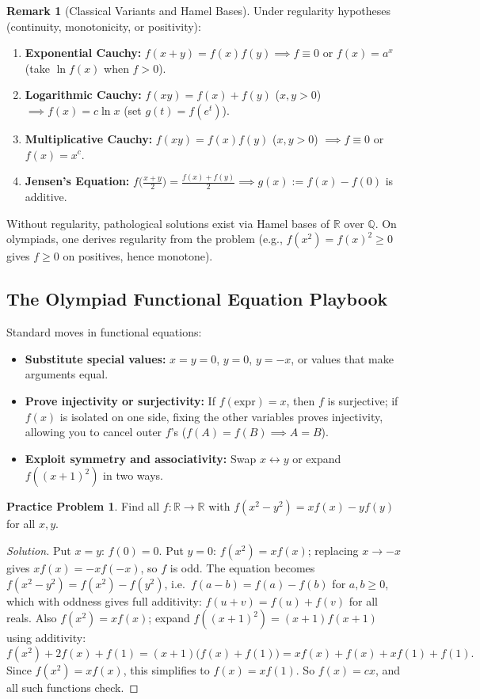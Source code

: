 \documentclass[11pt]{article}
\theoremstyle{plain}
\theoremstyle{definition}
\newtheorem{problem}[theorem]{Practice Problem}
\newtheorem{remark}[theorem]{Remark}
\newenvironment{solution}{\begin{proof}[Solution]}{\end{proof}}
\newcommand{\QQ}{\mathbb{Q}}
\newcommand{\RR}{\mathbb{R}}
\begin{document}
\begin{remark}[Classical Variants and Hamel Bases]
Under regularity hypotheses (continuity, monotonicity, or positivity):
\begin{enumerate}[label=(\arabic*)]
\item \textbf{Exponential Cauchy:} $f(x+y)=f(x)f(y) \implies f\equiv 0$ or $f(x)=a^x$ (take $\ln f(x)$ when $f>0$).
\item \textbf{Logarithmic Cauchy:} $f(xy)=f(x)+f(y)$ ($x,y>0$) $\implies f(x)=c\ln x$ (set $g(t)=f(e^t)$).
\item \textbf{Multiplicative Cauchy:} $f(xy)=f(x)f(y)$ ($x,y>0$) $\implies f\equiv 0$ or $f(x)=x^c$.
\item \textbf{Jensen's Equation:} $f\bigl(\frac{x+y}{2}\bigr) = \frac{f(x)+f(y)}{2} \implies g(x) := f(x)-f(0)$ is additive.
\end{enumerate}
Without regularity, pathological solutions exist via Hamel bases of $\RR$ over $\QQ$. On olympiads, one derives regularity from the problem (e.g., $f(x^2) = f(x)^2 \ge 0$ gives $f \ge 0$ on positives, hence monotone).
\end{remark}

\subsection{The Olympiad Functional Equation Playbook}
Standard moves in functional equations:
\begin{itemize}
\item \textbf{Substitute special values:} $x=y=0$, $y=0$, $y=-x$, or values that make arguments equal.
\item \textbf{Prove injectivity or surjectivity:} If $f(\text{expr}) = x$, then $f$ is surjective; if $f(x)$ is isolated on one side, fixing the other variables proves injectivity, allowing you to cancel outer $f$'s ($f(A)=f(B) \implies A=B$).
\item \textbf{Exploit symmetry and associativity:} Swap $x \leftrightarrow y$ or expand $f((x+1)^2)$ in two ways.
\end{itemize}

\begin{problem}
Find all $f\colon\RR\to\RR$ with $f(x^2 - y^2) = x f(x) - y f(y)$ for all $x,y$.
\end{problem}
\begin{solution}
Put $x=y$: $f(0)=0$. Put $y=0$: $f(x^2)=x f(x)$; replacing
$x \to -x$ gives $x f(x) = -x f(-x)$, so $f$ is odd. The equation becomes
$f(x^2-y^2)=f(x^2)-f(y^2)$, i.e.\ $f(a-b)=f(a)-f(b)$ for $a,b \ge 0$, which
with oddness gives full additivity: $f(u+v)=f(u)+f(v)$ for all reals.
Also $f(x^2)=xf(x)$; expand $f((x+1)^2) = (x+1)f(x+1)$ using additivity:
\[
f(x^2) + 2f(x) + f(1) = (x+1)\bigl(f(x)+f(1)\bigr)
= x f(x) + f(x) + x f(1) + f(1).
\]
Since $f(x^2)=xf(x)$, this simplifies to $f(x) = x f(1)$. So $f(x)=cx$, and all
such functions check.
\end{solution}
\end{document}
